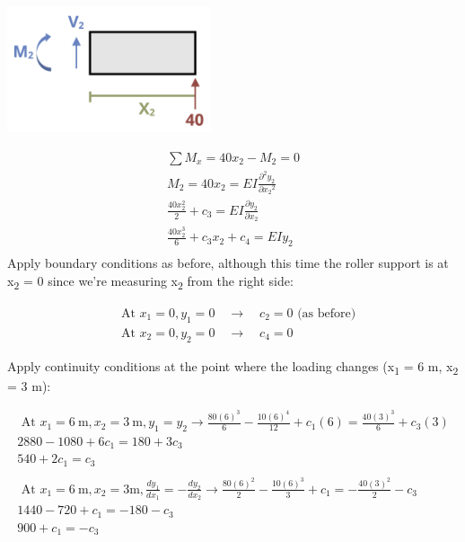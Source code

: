 \documentclass[
  letterpaper,
  DIV=11,
  numbers=noendperiod]{scrreprt}
\theoremstyle{definition}
\theoremstyle{remark}
\begin{document}
\begin{tcolorbox}
\begin{tcolorbox}
\begin{center}
\includegraphics[width=2.36458in,height=\textheight]{images/CH11 PNGs/example11.3v2-2.png}
\end{center}

\[
\begin{gathered}
\sum M_x= 40 x_2-M_2=0 \\
M_2=40 x_2=EI\frac{\partial^2 y_2}{\partial x_2{ }^2} \\
\frac{40 x_2^2}{2}+c_3=EI \frac{\partial y_2}{\partial x_2} \\
\frac{40 x_2^3}{6}+c_3 x_2+c_4=E I y_2 \\
\end{gathered}
\]Apply boundary conditions as before, although this time the roller
support is at x\textsubscript{2} = 0 since we're measuring
x\textsubscript{2} from the right side:

\[
\begin{aligned} & \text { At } x_1=0, y_1=0 \quad \rightarrow \quad c_2=0 \text { (as before) }\\ & \text { At } x_2=0, y_2=0 \quad \rightarrow \quad c_4=0\end{aligned}
\]

Apply continuity conditions at the point where the loading changes
(x\textsubscript{1} = 6 m, x\textsubscript{2} = 3 m):

\[
\begin{gathered} \text { At } x_1=6 \mathrm{~m}, x_2=3 \mathrm{~m}, y_1=y_2 \rightarrow \frac{80(6)^3}{6}-\frac{10(6)^4}{12}+ c_1(6)=\frac{40(3)^3}{6}+c_3(3) \\ 2880-1080+6 c_1=180+3 c_3 \\ 540+2 c_1=c_3 \\ \\ \text { At } x_1=6 \mathrm{~m},  x_2=3 \mathrm{m}, \frac{d y_1}{d x_1}=-\frac{d y_2}{d x_2} \rightarrow \frac{80(6)^2}{2}-\frac{10(6)^3}{3}+c_1=-\frac{40(3)^2}{2}-c_3 \\ 1440-720+c_1=-180-c_3 \\ 900+c_1=-c_3 \\\end{gathered}
\]


\end{tcolorbox}
\end{tcolorbox}
\end{document}
